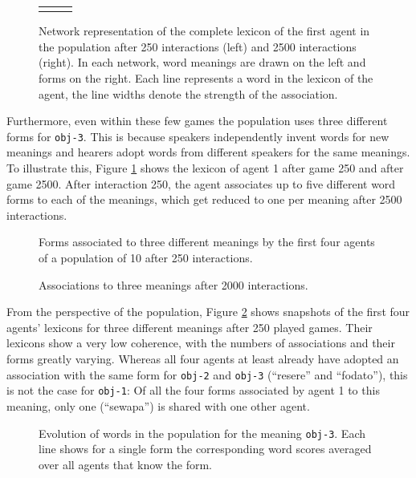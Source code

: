 \begin{figure}[t]
\begin{tabular}{cp{1cm}c}
    & & \\
  \end{tabular}
  \caption{Network representation of the complete lexicon of the first
    agent in the population after 250 interactions (left) and 2500
    interactions (right). In each network, word meanings are drawn on
    the left and forms on the right. Each line represents a word in
    the lexicon of the agent, the line widths denote the strength of
    the association.}
  \label{f:ng-lexicon}
\end{figure}


Furthermore, even within these few games the population uses three
different forms for \texttt{obj-3}. This is because speakers
independently invent words for new meanings and hearers adopt words
from different speakers for the same meanings. To illustrate this,
Figure \ref{f:ng-lexicon} shows the lexicon of agent 1 after game 250
and after game 2500. After interaction 250, the agent associates up to
five different word forms to each of the meanings, which get reduced
to one per meaning after 2500 interactions. 

\startfiguregroup

\begin{figure}[t]
  
  \caption{Forms associated to three different meanings by the first
    four agents of a population of 10 after 250 interactions.}
  \label{f:ng-lexicon-250}
\end{figure}

\begin{figure}[t]
  
  \caption{Associations to three meanings after 2000 interactions.}
  \label{f:ng-lexicon-2000}
\end{figure}

\stopfiguregroup

From the perspective of the population, Figure \ref{f:ng-lexicon-250}
shows snapshots of the first four agents' lexicons for three different
meanings after 250 played games. Their lexicons show a very low
coherence, with the numbers of associations and their forms greatly
varying. Whereas all four agents at least already have adopted an
association with the same form for \texttt{obj-2} and \texttt{obj-3}
(``resere'' and ``fodato''), this is not the case for \texttt{obj-1}:
Of all the four forms associated by agent 1 to this meaning, only one
(``sewapa'') is shared with one other agent.

\begin{figure}[t]
  \caption{Evolution of words in the population for the meaning
    \texttt{obj-3}. Each line shows for a single form the
    corresponding word scores averaged over all agents that know the
    form.}
  \label{f:ng-word-form-scores-obj-3}
\end{figure}


